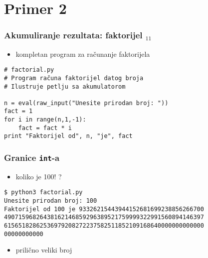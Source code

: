 \documentclass[utf8,compress]{beamer}
\begin{document}

\section{Primer 2}


\begin{frame}[fragile]
  \frametitle{Akumuliranje rezultata: faktorijel $_{11}$}
  \begin{itemize}
    \item kompletan program za računanje faktorijela
  \end{itemize}
\begin{verbatim}
# factorial.py
# Program računa faktorijel datog broja
# Ilustruje petlju sa akumulatorom

n = eval(raw_input("Unesite prirodan broj: "))
fact = 1
for i in range(n,1,-1): 
    fact = fact * i
print "Faktorijel od", n, "je", fact
\end{verbatim}
\end{frame}

\begin{frame}[fragile]
  \frametitle{Granice \texttt{int}-a}
  \begin{itemize}
    \item koliko je 100! ?
  \end{itemize}
\begin{verbatim}
$ python3 factorial.py
Unesite prirodan broj: 100
Faktorijel od 100 je 93326215443944152681699238856266700
49071596826438162146859296389521759999322991560894146397
61565182862536979208272237582511852109168640000000000000
00000000000
\end{verbatim}
  \begin{itemize}
    \item prilično veliki broj
  \end{itemize}
\end{frame}
\end{document}
